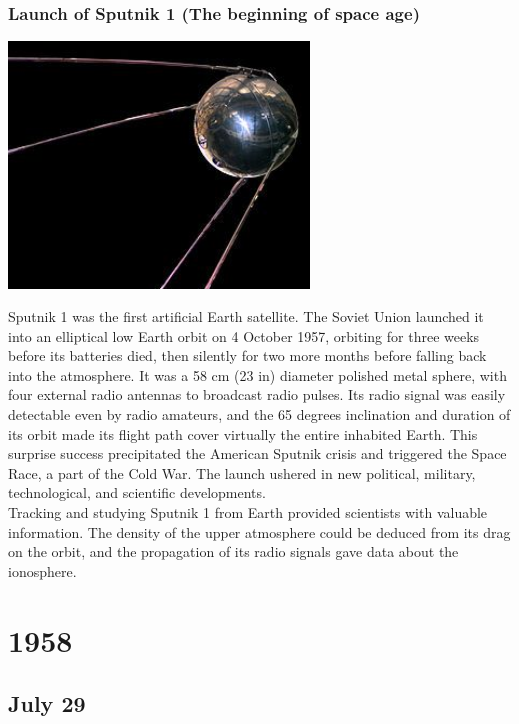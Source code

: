 \documentclass[11pt]{report}
\begin{document}
\subsection{Launch of Sputnik 1 (The beginning of space age)}
\vspace{2mm}\begin{center}\includegraphics[width=8cm]{./img/sputnik1.jpg}\end{center}
Sputnik 1 was the first artificial Earth satellite. The Soviet Union launched it into an elliptical low Earth orbit on 4 October 1957, orbiting for three weeks before its batteries died, then silently for two more months before falling back into the atmosphere. It was a 58 cm (23 in) diameter polished metal sphere, with four external radio antennas to broadcast radio pulses. Its radio signal was easily detectable even by radio amateurs, and the 65 degrees inclination and duration of its orbit made its flight path cover virtually the entire inhabited Earth. This surprise success precipitated the American Sputnik crisis and triggered the Space Race, a part of the Cold War. The launch ushered in new political, military, technological, and scientific developments.\\
\indent Tracking and studying Sputnik 1 from Earth provided scientists with valuable information. The density of the upper atmosphere could be deduced from its drag on the orbit, and the propagation of its radio signals gave data about the ionosphere.

\chapter{1958}
\section{July 29}
\end{document}

